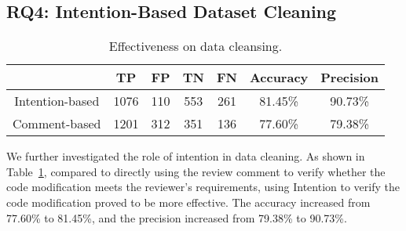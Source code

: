 

\subsection{RQ4: Intention-Based Dataset Cleaning}



\begin{table}[!t]
\centering
\caption{Effectiveness on data cleansing.}
\scriptsize
\label{tb:rq4}
\begin{tabular}{ccccccc}
\hline
          & TP   & FP  & TN  & FN  & Accuracy & Precision \\ \hline
Intention-based & 1076 & 110 & 553 & 261 & 81.45\%  & 90.73\%   \\
Comment-based    & 1201 & 312 & 351 & 136 & 77.60\%  & 79.38\%   \\ \hline
\end{tabular}
\vspace{-4mm}
\end{table}

We further investigated the role of intention in data cleaning. As shown in Table~\ref{tb:rq4}, compared to directly using the review comment to verify whether the code modification meets the reviewer’s requirements, using Intention to verify the code modification proved to be more effective. The accuracy increased from 77.60\% to 81.45\%, and the precision increased from 79.38\% to 90.73\%.

